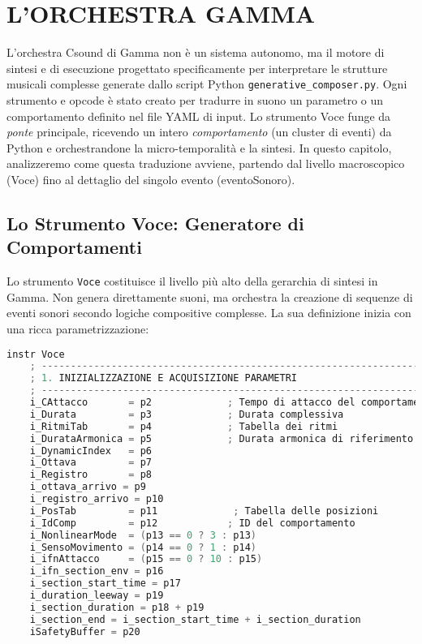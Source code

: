 
\section{L'ORCHESTRA GAMMA}
L'orchestra Csound di Gamma non è un sistema autonomo, ma il motore di sintesi e di esecuzione progettato specificamente per interpretare le strutture musicali complesse generate dallo script Python \texttt{generative\_composer.py}. Ogni strumento e opcode è stato creato per tradurre in suono un parametro o un comportamento definito nel file YAML di input. Lo strumento Voce funge da \textit{ponte} principale, ricevendo un intero \textit{comportamento} (un cluster di eventi) da Python e orchestrandone la micro-temporalità e la sintesi. In questo capitolo, analizzeremo come questa traduzione avviene, partendo dal livello macroscopico (Voce) fino al dettaglio del singolo evento (eventoSonoro).
\subsection{Lo Strumento Voce: Generatore di Comportamenti}
Lo strumento \texttt{Voce} costituisce il livello più alto della gerarchia di sintesi in Gamma. Non genera direttamente suoni, ma orchestra la creazione di sequenze di eventi sonori secondo logiche compositive complesse. La sua definizione inizia con una ricca parametrizzazione:

\begin{lstlisting}[language=C]
instr Voce
    ; -----------------------------------------------------------------------
    ; 1. INIZIALIZZAZIONE E ACQUISIZIONE PARAMETRI
    ; -----------------------------------------------------------------------
    i_CAttacco       = p2             ; Tempo di attacco del comportamento
    i_Durata         = p3             ; Durata complessiva
    i_RitmiTab       = p4             ; Tabella dei ritmi
    i_DurataArmonica = p5             ; Durata armonica di riferimento
    i_DynamicIndex   = p6         
    i_Ottava         = p7             
    i_Registro       = p8             
    i_ottava_arrivo = p9
    i_registro_arrivo = p10
    i_PosTab         = p11             ; Tabella delle posizioni
    i_IdComp         = p12            ; ID del comportamento
    i_NonlinearMode  = (p13 == 0 ? 3 : p13)
    i_SensoMovimento = (p14 == 0 ? 1 : p14) 
    i_ifnAttacco     = (p15 == 0 ? 10 : p15)
    i_ifn_section_env = p16 
    i_section_start_time = p17
    i_duration_leeway = p19
    i_section_duration = p18 + p19
    i_section_end = i_section_start_time + i_section_duration
    iSafetyBuffer = p20
\end{lstlisting}

